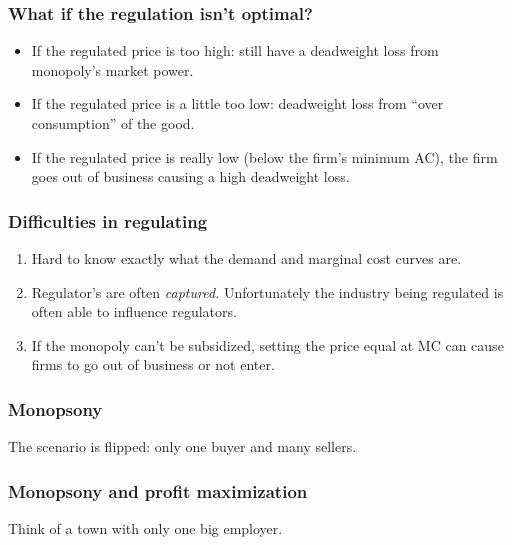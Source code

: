 \documentclass[xcolor=pdftex,dvipsnames]{beamer}
\begin{document}
\begin{frame}
  \frametitle{What if the regulation isn't optimal?}
  \begin{itemize}
  \item If the regulated price is too high: still have a deadweight
    loss from monopoly's market power.
  \item<2-> If the regulated price is a little too low: deadweight loss from
    ``over consumption'' of the good.
  \item<3-> If the regulated price is really low (below the firm's
    minimum AC), the firm goes out of business causing a high
    deadweight loss.
  \end{itemize}
\end{frame}

\begin{frame}
  \frametitle{Difficulties in regulating}
  \begin{enumerate}
  \item Hard to know exactly what the demand and marginal cost curves are.

  \item<2-> Regulator's are often \emph{captured.} Unfortunately the
    industry being regulated is often able to influence regulators.
  \item<3-> If the monopoly can't be subsidized, setting the price
    equal at MC can cause firms to go out of business or not enter.
  \end{enumerate}
\end{frame}


\begin{frame}
  \frametitle{Monopsony}
  The scenario is flipped: only one buyer and many sellers.

  \bigskip
{}

  

  \bigskip
{}
\end{frame}


\begin{frame}
  \frametitle{Monopsony and profit maximization}
  Think of a town with only one big employer.
  
  \bigskip
{}
  \bigskip


  \bigskip
{}


\end{frame}
\end{document}
